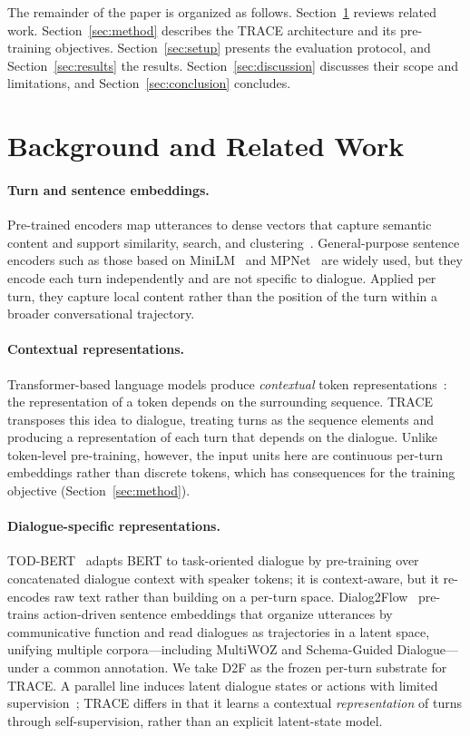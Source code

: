 \documentclass[11pt]{article}
\begin{document}
The remainder of the paper is organized as follows. Section~\ref{sec:background} reviews related
work. Section~\ref{sec:method} describes the TRACE architecture and its pre-training objectives.
Section~\ref{sec:setup} presents the evaluation protocol, and Section~\ref{sec:results} the results.
Section~\ref{sec:discussion} discusses their scope and limitations, and Section~\ref{sec:conclusion}
concludes.

\section{Background and Related Work}
\label{sec:background}

\paragraph{Turn and sentence embeddings.}
Pre-trained encoders map utterances to dense vectors that capture semantic content and support
similarity, search, and clustering~\cite{reimers2019sentencebert}. General-purpose sentence encoders
such as those based on MiniLM~\cite{wang2020minilm} and MPNet~\cite{song2020mpnet} are widely used,
but they encode each turn independently and are not specific to dialogue. Applied per turn, they
capture local content rather than the position of the turn within a broader conversational
trajectory.

\paragraph{Contextual representations.}
Transformer-based language models produce \emph{contextual} token
representations~\cite{vaswani2017attention,devlin2019bert}: the representation of a token depends on
the surrounding sequence. TRACE transposes this idea to dialogue, treating turns as the sequence
elements and producing a representation of each turn that depends on the dialogue. Unlike token-level
pre-training, however, the input units here are continuous per-turn embeddings rather than discrete
tokens, which has consequences for the training objective (Section~\ref{sec:method}).

\paragraph{Dialogue-specific representations.}
TOD-BERT~\cite{wu2020todbert} adapts BERT to task-oriented dialogue by pre-training over concatenated
dialogue context with speaker tokens; it is context-aware, but it re-encodes raw text rather than
building on a per-turn space. Dialog2Flow~\cite{burdisso2024dialog2flow} pre-trains
action-driven sentence embeddings that organize utterances by communicative function and read
dialogues as trajectories in a latent space, unifying multiple corpora---including
MultiWOZ and Schema-Guided Dialogue---under a common annotation. We take D2F as the frozen per-turn
substrate for TRACE. A parallel line induces latent dialogue states or actions with limited
supervision~\cite{wen2018sequence,min2020dialogue,hudecek2022latent,liu2023vls}; TRACE differs in
that it learns a contextual \emph{representation} of turns through self-supervision, rather than an
explicit latent-state model.
\end{document}
